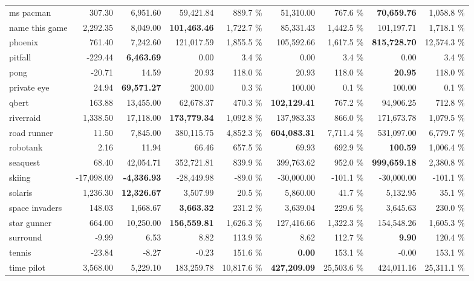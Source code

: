 \documentclass{article}
\begin{document}
\begin{table}
\begin{center}
\begin{tabularx}{\textwidth}{X| r r r r r r r r}
ms pacman &307.30 & 6,951.60 & 59,421.84 & 889.7 \% & 51,310.00 & 767.6 \% & \textbf{70,659.76} & 1,058.8 \%\\
name this game &2,292.35 & 8,049.00 & \textbf{101,463.46} & 1,722.7 \% & 85,331.43 & 1,442.5 \% & 101,197.71 & 1,718.1 \%\\
phoenix &761.40 & 7,242.60 & 121,017.59 & 1,855.5 \% & 105,592.66 & 1,617.5 \% & \textbf{815,728.70} & 12,574.3 \%\\
pitfall &-229.44 & \textbf{6,463.69} & 0.00 & 3.4 \% & 0.00 & 3.4 \% & 0.00 & 3.4 \%\\
pong &-20.71 & 14.59 & 20.93 & 118.0 \% & 20.93 & 118.0 \% & \textbf{20.95} & 118.0 \%\\
private eye &24.94 & \textbf{69,571.27} & 200.00 & 0.3 \% & 100.00 & 0.1 \% & 100.00 & 0.1 \%\\
qbert &163.88 & 13,455.00 & 62,678.37 & 470.3 \% & \textbf{102,129.41} & 767.2 \% & 94,906.25 & 712.8 \%\\
riverraid &1,338.50 & 17,118.00 & \textbf{173,779.34} & 1,092.8 \% & 137,983.33 & 866.0 \% & 171,673.78 & 1,079.5 \%\\
road runner &11.50 & 7,845.00 & 380,115.75 & 4,852.3 \% & \textbf{604,083.31} & 7,711.4 \% & 531,097.00 & 6,779.7 \%\\
robotank &2.16 & 11.94 & 66.46 & 657.5 \% & 69.93 & 692.9 \% & \textbf{100.59} & 1,006.4 \%\\
seaquest &68.40 & 42,054.71 & 352,721.81 & 839.9 \% & 399,763.62 & 952.0 \% & \textbf{999,659.18} & 2,380.8 \%\\
skiing &-17,098.09 & \textbf{-4,336.93} & -28,449.98 & -89.0 \% & -30,000.00 & -101.1 \% & -30,000.00 & -101.1 \%\\
solaris &1,236.30 & \textbf{12,326.67} & 3,507.99 & 20.5 \% & 5,860.00 & 41.7 \% & 5,132.95 & 35.1 \%\\
space invaders &148.03 & 1,668.67 & \textbf{3,663.32} & 231.2 \% & 3,639.04 & 229.6 \% & 3,645.63 & 230.0 \%\\
star gunner &664.00 & 10,250.00 & \textbf{156,559.81} & 1,626.3 \% & 127,416.66 & 1,322.3 \% & 154,548.26 & 1,605.3 \%\\
surround &-9.99 & 6.53 & 8.82 & 113.9 \% & 8.62 & 112.7 \% & \textbf{9.90} & 120.4 \%\\
tennis &-23.84 & -8.27 & -0.23 & 151.6 \% & \textbf{0.00} & 153.1 \% & -0.00 & 153.1 \%\\
time pilot &3,568.00 & 5,229.10 & 183,259.78 & 10,817.6 \% & \textbf{427,209.09} & 25,503.6 \% & 424,011.16 & 25,311.1 \%\\

\end{tabularx}
\end{center}
\end{table}
\end{document}
